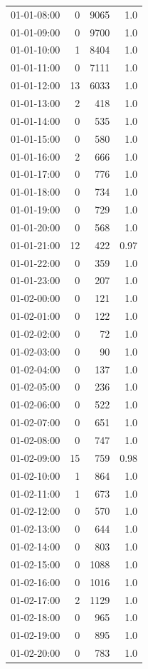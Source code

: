 \documentclass[11pt]{article}
\begin{document}
\begin{enumerate}
\begin{table}[htbp]
\begin{tabular}{rrrr}
01-01-08:00 & 0 & 9065 & 1.0\\
01-01-09:00 & 0 & 9700 & 1.0\\
01-01-10:00 & 1 & 8404 & 1.0\\
01-01-11:00 & 0 & 7111 & 1.0\\
01-01-12:00 & 13 & 6033 & 1.0\\
01-01-13:00 & 2 & 418 & 1.0\\
01-01-14:00 & 0 & 535 & 1.0\\
01-01-15:00 & 0 & 580 & 1.0\\
01-01-16:00 & 2 & 666 & 1.0\\
01-01-17:00 & 0 & 776 & 1.0\\
01-01-18:00 & 0 & 734 & 1.0\\
01-01-19:00 & 0 & 729 & 1.0\\
01-01-20:00 & 0 & 568 & 1.0\\
01-01-21:00 & 12 & 422 & 0.97\\
01-01-22:00 & 0 & 359 & 1.0\\
01-01-23:00 & 0 & 207 & 1.0\\
01-02-00:00 & 0 & 121 & 1.0\\
01-02-01:00 & 0 & 122 & 1.0\\
01-02-02:00 & 0 & 72 & 1.0\\
01-02-03:00 & 0 & 90 & 1.0\\
01-02-04:00 & 0 & 137 & 1.0\\
01-02-05:00 & 0 & 236 & 1.0\\
01-02-06:00 & 0 & 522 & 1.0\\
01-02-07:00 & 0 & 651 & 1.0\\
01-02-08:00 & 0 & 747 & 1.0\\
01-02-09:00 & 15 & 759 & 0.98\\
01-02-10:00 & 1 & 864 & 1.0\\
01-02-11:00 & 1 & 673 & 1.0\\
01-02-12:00 & 0 & 570 & 1.0\\
01-02-13:00 & 0 & 644 & 1.0\\
01-02-14:00 & 0 & 803 & 1.0\\
01-02-15:00 & 0 & 1088 & 1.0\\
01-02-16:00 & 0 & 1016 & 1.0\\
01-02-17:00 & 2 & 1129 & 1.0\\
01-02-18:00 & 0 & 965 & 1.0\\
01-02-19:00 & 0 & 895 & 1.0\\
01-02-20:00 & 0 & 783 & 1.0\\

\end{tabular}
\end{table}
\end{enumerate}
\end{document}
